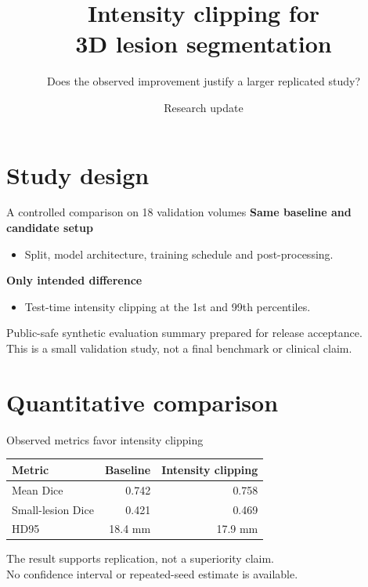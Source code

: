 \documentclass[aspectratio=169]{beamer}
\title{Intensity clipping for\\3D lesion segmentation}
\subtitle{Does the observed improvement justify a larger replicated study?}
\author{Research update}
\institute{Public-safe synthetic evaluation summary}
\date{}
\begin{document}
\maketitle
\section{Study design}
\begin{frame}{A controlled comparison on 18 validation volumes}
\textbf{Same baseline and candidate setup}
\begin{itemize}
\item Split, model architecture, training schedule and post-processing.
\end{itemize}
\vspace{0.6em}
\textbf{Only intended difference}
\begin{itemize}
\item Test-time intensity clipping at the 1st and 99th percentiles.
\end{itemize}
\vspace{0.8em}
Public-safe synthetic evaluation summary prepared for release acceptance.\\[0.5em]
This is a small validation study, not a final benchmark or clinical claim.
\end{frame}
\section{Quantitative comparison}
\begin{frame}{Observed metrics favor intensity clipping}
\begin{center}
\large
\renewcommand{\arraystretch}{1.45}
\begin{tabular}{lrr}
\toprule
Metric & Baseline & Intensity clipping \\
\midrule
Mean Dice & 0.742 & 0.758 \\
Small-lesion Dice & 0.421 & 0.469 \\
HD95 & 18.4 mm & 17.9 mm \\
\bottomrule
\end{tabular}
\end{center}
\vspace{0.6em}
The result supports replication, not a superiority claim.\\[0.4em]
No confidence interval or repeated-seed estimate is available.
\end{frame}
\end{document}
